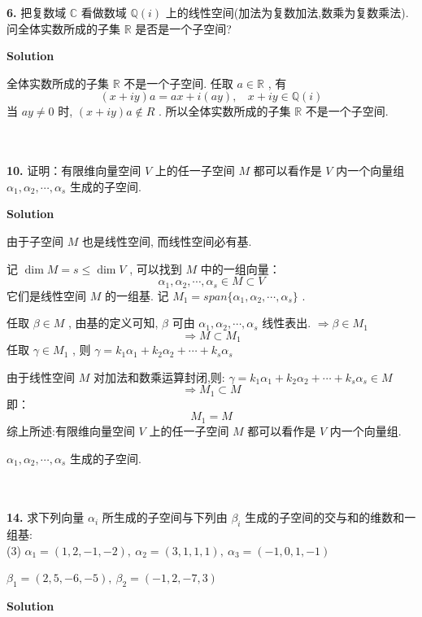\documentclass[11pt,a4paper,openany,oneside]{book}
\newcommand\Solution{\noindent\textbf{\textsf{Solution}}\par\medskip}
\begin{document}
\begin{myexample}
	\textbf{6.} 
把复数域 $ \mathbb{C} $ 看做数域 $ \mathbb{Q}(i) $ 上的线性空间(加法为复数加法,数乘为复数乘法). 问全体实数所成的子集 $ \mathbb{R} $ 是否是一个子空间?  \\  

\end{myexample}
\Solution 

全体实数所成的子集 $ \mathbb{R} $ 不是一个子空间. 任取 $ a \in \mathbb{R} $ , 有
 $$  (x+iy)a = ax + i(ay), \ \ \ \ x+iy \in \mathbb{Q}(i)   $$ 
当 $ ay \neq 0 $ 时,  $ (x+iy)a \notin R $ . 所以全体实数所成的子集 $ \mathbb{R} $ 不是一个子空间.  \\  \\  \\ 

\begin{myexample}
	\textbf{10.} 
证明：有限维向量空间 $ V $ 上的任一子空间 $ M $ 都可以看作是 $ V $ 内一个向量组 $ \alpha_1, \alpha_2, \cdots, \alpha_s $ 生成的子空间.  \\

\end{myexample}
\Solution

由于子空间 $ M $ 也是线性空间, 而线性空间必有基.

记 $ \dim   M = s \leq \dim V $ , 可以找到 $ M $ 中的一组向量：
 $$  \alpha_1, \alpha_2, \cdots, \alpha_s  \in M \subset V $$ 
它们是线性空间 $ M $ 的一组基. 记 $ M_1 = span\{\alpha_1, \alpha_2, \cdots, \alpha_s \} $ .

任取 $ \beta \in M $ , 由基的定义可知,  $ \beta $ 可由 $ \alpha_1, \alpha_2, \cdots, \alpha_s $ 线性表出.  $ \Rightarrow \beta \in M_1  $  
 $$  \Rightarrow M \subset M_1  $$ 
任取 $ \gamma \in M_1 $ , 则 $ \gamma = k_1\alpha_1 + k_2\alpha_2 + \cdots + k_s\alpha_s  $ 

由于线性空间 $ M $ 对加法和数乘运算封闭,则:  $  \gamma = k_1\alpha_1 + k_2\alpha_2 + \cdots + k_s\alpha_s \in M  $ 
 $$  \Rightarrow M_1 \subset M   $$ 
即：
 $$  M_1 = M  $$ 
综上所述:有限维向量空间 $ V $ 上的任一子空间 $ M $ 都可以看作是 $ V $ 内一个向量组.

 $ \alpha_1, \alpha_2, \cdots, \alpha_s $ 生成的子空间. \\  \\   \\

\begin{myexample}
	\textbf{14.} 
求下列向量 $ \alpha_i $ 所生成的子空间与下列由 $ \beta_i $ 生成的子空间的交与和的维数和一组基: \\
(3)  $ \alpha_1 = (1, 2, -1, -2), \ \alpha_2 = (3, 1, 1, 1), \ \alpha_3 = (-1, 0, 1, -1) $  

\hspace{1em}  $ \beta_1 = (2, 5, -6, -5), \ \beta_2 = (-1, 2, -7, 3) $  \\

\end{myexample}
\Solution 
\end{document}
